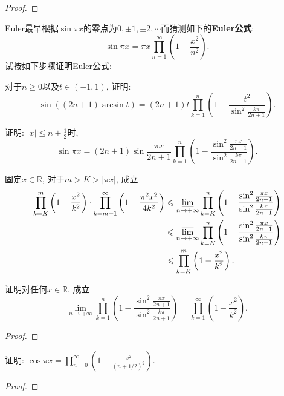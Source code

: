\begin{quizb}
\begin{proof}
\end{proof}
\woe Euler最早根据\(\sin \pi x\)的零点为\(0,\pm 1,\pm 2,\cdots\)而猜测如下的\textbf{Euler公式}: \[\sin \pi x=\pi x\prod_{n=1}^{\infty}\left(1-\frac{x^2}{n^2}\right).\]试按如下步骤证明Euler公式:
\begin{quizs}
\item 对于\(n\geqslant 0\)以及\(t\in (-1,1)\), 证明:\[\sin\left((2n+1)\arcsin t\right)=(2n+1)t\prod_{k=1}^{n}\left(1-\frac{t^2}{\sin^2\frac{k\pi}{2n+1}}\right).\]
\item 证明: \(|x|\leqslant n+\frac{1}{2}\)时,\[\sin \pi x=(2n+1)\sin\frac{\pi x}{2n+1}\prod_{k=1}^{n}\left(1-\frac{\sin^2\frac{\pi x}{2n+1}}{\sin^2\frac{k\pi}{2n+1}}\right).\]
\item 固定\(x\in\mathbb{R}\), 对于\(m>K>|\pi x|\), 成立
\[\begin{split}
\prod_{k=K}^{m}\left(1-\frac{x^2}{k^2}\right)\cdot\prod_{k=m+1}^{\infty}\left(1-\frac{\pi^2x^2}{4k^2}\right)&\leqslant\varliminf_{n\rightarrow+\infty}\prod_{k=K}^{n}\left(1-\frac{\sin^2\frac{\pi x}{2n+1}}{\sin^2\frac{k\pi}{2n+1}}\right)\\&\leqslant\varlimsup_{n\rightarrow+\infty}\prod_{k=K}^{n}\left(1-\frac{\sin^2\frac{\pi x}{2n+1}}{\sin^2\frac{k\pi}{2n+1}}\right)\\&\leqslant\prod_{k=K}^{m}\left(1-\frac{x^2}{k^2}\right). \end{split}\]
\item 证明对任何\(x\in\mathbb{R}\), 成立\[\lim_{n\rightarrow+\infty}\prod_{k=1}^{n}\left(1-\frac{\sin^2\frac{\pi x}{2n+1}}{\sin^2\frac{k\pi}{2n+1}}\right)=\prod_{k=1}^{\infty}\left(1-\frac{x^2}{k^2}\right).\]
\end{quizs}
\begin{proof}

\end{proof}
\woe 证明: \(\cos \pi x=\prod_{n=0}^{\infty}\left(1-\frac{x^2}{\left(n+1/2\right)^2}\right)\).
\begin{proof}

\end{proof}
\end{quizb}